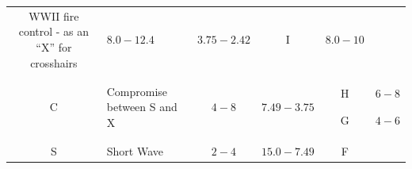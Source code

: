 \documentclass[
]{book}
\begin{document}
\begin{longtable}[]{@{}clcccc@{}}
\begin{minipage}[t]{0.25\columnwidth}
WWII fire control - as an ``X'' for crosshairs\strut
\end{minipage} & \begin{minipage}[t]{0.15\columnwidth}\centering
\(8.0-12.4\)\strut
\end{minipage} & \begin{minipage}[t]{0.09\columnwidth}\centering
\(3.75 - 2.42\)\strut
\end{minipage} & \begin{minipage}[t]{0.14\columnwidth}\centering
I\strut
\end{minipage} & \begin{minipage}[t]{0.06\columnwidth}\centering
\(8.0-10\)\strut
\end{minipage}\tabularnewline
\begin{minipage}[t]{0.14\columnwidth}\centering
C\strut
\end{minipage} & \begin{minipage}[t]{0.25\columnwidth}\raggedright
Compromise between S and X\strut
\end{minipage} & \begin{minipage}[t]{0.15\columnwidth}\centering
\(4-8\)\strut
\end{minipage} & \begin{minipage}[t]{0.09\columnwidth}\centering
\(7.49 - 3.75\)\strut
\end{minipage} & \begin{minipage}[t]{0.14\columnwidth}\centering
H

G\strut
\end{minipage} & \begin{minipage}[t]{0.06\columnwidth}\centering
\(6-8\)

\(4-6\)\strut
\end{minipage}\tabularnewline
\begin{minipage}[t]{0.14\columnwidth}\centering
S\strut
\end{minipage} & \begin{minipage}[t]{0.25\columnwidth}\raggedright
Short Wave\strut
\end{minipage} & \begin{minipage}[t]{0.15\columnwidth}\centering
\(2-4\)\strut
\end{minipage} & \begin{minipage}[t]{0.09\columnwidth}\centering
\(15.0 - 7.49\)\strut
\end{minipage} & \begin{minipage}[t]{0.14\columnwidth}\centering
F


\end{minipage}
\end{longtable}
\end{document}
